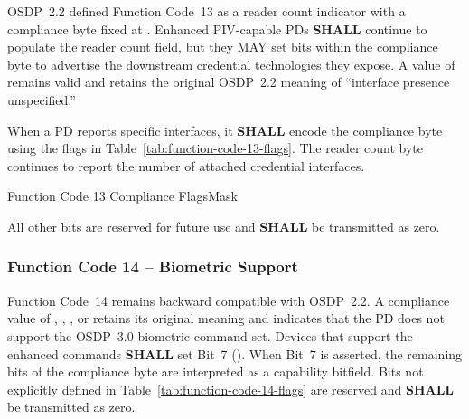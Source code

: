 OSDP~2.2 defined Function Code~13 as a reader count indicator with a compliance byte fixed at . Enhanced PIV-capable PDs \textbf{SHALL} continue to populate the reader count field, but they MAY set bits within the compliance byte to advertise the downstream credential technologies they expose. A value of  remains valid and retains the original OSDP~2.2 meaning of “interface presence unspecified.”

When a PD reports specific interfaces, it \textbf{SHALL} encode the compliance byte using the flags in Table~\ref{tab:function-code-13-flags}. The reader count byte continues to report the number of attached credential interfaces.

\begin{ValueDescriptionTable}{Function Code 13 Compliance Flags}{Mask}
  \label{tab:function-code-13-flags}
\end{ValueDescriptionTable}
\noindent All other bits are reserved for future use and \textbf{SHALL} be transmitted as zero.

\subsubsection{Function Code 14 – Biometric Support}

Function Code~14 remains backward compatible with OSDP~2.2. A compliance value of , , , or  retains its original meaning and indicates that the PD does not support the OSDP~3.0 biometric command set. Devices that support the enhanced commands \textbf{SHALL} set Bit~7 (). When Bit~7 is asserted, the remaining bits of the compliance byte are interpreted as a capability bitfield. Bits not explicitly defined in Table~\ref{tab:function-code-14-flags} are reserved and \textbf{SHALL} be transmitted as zero.

